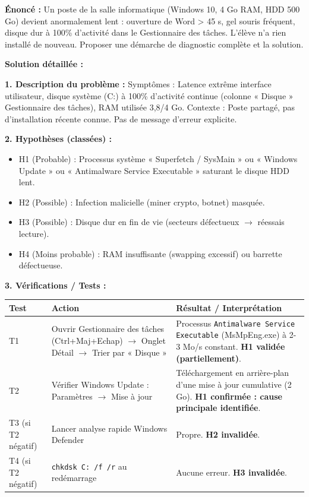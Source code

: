\documentclass[11pt]{article}
\begin{document}
\begin{exoresolu}
\textbf{Énoncé :} Un poste de la salle informatique (Windows 10, 4 Go RAM, HDD 500 Go) devient anormalement lent : ouverture de Word > 45 s, gel souris fréquent, disque dur à 100\% d'activité dans le Gestionnaire des tâches. L'élève n'a rien installé de nouveau. Proposer une démarche de diagnostic complète et la solution.

\tcblower
\textbf{Solution détaillée :}

\textbf{1. Description du problème :}
Symptômes : Latence extrême interface utilisateur, disque système (C:) à 100\% d'activité continue (colonne « Disque » Gestionnaire des tâches), RAM utilisée 3,8/4 Go. Contexte : Poste partagé, pas d'installation récente connue. Pas de message d'erreur explicite.

\textbf{2. Hypothèses (classées) :}
\begin{itemize}
    \item H1 (Probable) : Processus système « Superfetch / SysMain » ou « Windows Update » ou « Antimalware Service Executable » saturant le disque HDD lent.
    \item H2 (Possible) : Infection malicielle (miner crypto, botnet) masquée.
    \item H3 (Possible) : Disque dur en fin de vie (secteurs défectueux $\to$ réessais lecture).
    \item H4 (Moins probable) : RAM insuffisante (swapping excessif) ou barrette défectueuse.
\end{itemize}

\textbf{3. Vérifications / Tests :}
\begin{center}
\begin{tabularx}{\linewidth}{|l|X|X|}
\hline
\textbf{Test} & \textbf{Action} & \textbf{Résultat / Interprétation} \\
\hline
T1 & Ouvrir Gestionnaire des tâches (Ctrl+Maj+Echap) $\to$ Onglet Détail $\to$ Trier par « Disque » & Processus \texttt{Antimalware Service Executable} (MsMpEng.exe) à 2-3 Mo/s constant. \textbf{H1 validée (partiellement)}. \\
\hline
T2 & Vérifier Windows Update : Paramètres $\to$ Mise à jour & Téléchargement en arrière-plan d'une mise à jour cumulative (2 Go). \textbf{H1 confirmée : cause principale identifiée}. \\
\hline
T3 (si T2 négatif) & Lancer analyse rapide Windows Defender & Propre. \textbf{H2 invalidée}. \\
\hline
T4 (si T2 négatif) & \texttt{chkdsk C: /f /r} au redémarrage & Aucune erreur. \textbf{H3 invalidée}. \\
\hline
\end{tabularx}
\end{center}


\end{exoresolu}
\end{document}
